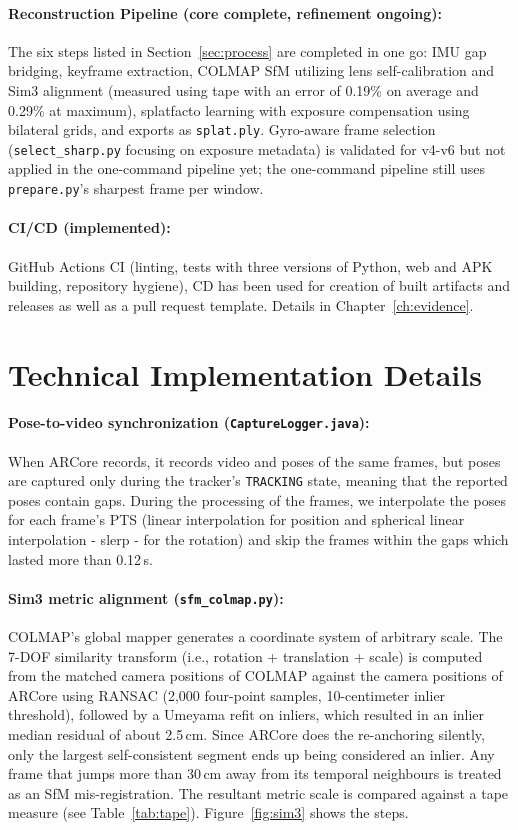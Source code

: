 \paragraph{Reconstruction Pipeline (core complete, refinement ongoing):} The six steps listed in Section~\ref{sec:process} are completed in one go: IMU gap bridging, keyframe extraction, COLMAP SfM utilizing lens self-calibration and Sim3 alignment (measured using tape with an error of 0.19\% on average and 0.29\% at maximum), splatfacto learning with exposure compensation using bilateral grids, and exports as \texttt{splat.ply}. Gyro-aware frame selection (\texttt{select\_sharp.py} focusing on exposure metadata) is validated for v4-v6 but not applied in the one-command pipeline yet; the one-command pipeline still uses \texttt{prepare.py}'s sharpest frame per window.

\paragraph{CI/CD (implemented):} GitHub Actions CI (linting, tests with three versions of Python, web and APK building, repository hygiene), CD has been used for creation of built artifacts and releases as well as a pull request template. Details in Chapter~\ref{ch:evidence}.

\section{Technical Implementation Details}

\paragraph{Pose-to-video synchronization (\texttt{CaptureLogger.java}):} When ARCore records, it records video and poses of the same frames, but poses are captured only during the tracker's \texttt{TRACKING} state, meaning that the reported poses contain gaps. During the processing of the frames, we interpolate the poses for each frame's PTS (linear interpolation for position and spherical linear interpolation - slerp - for the rotation) and skip the frames within the gaps which lasted more than 0.12\,s.

\paragraph{Sim3 metric alignment (\texttt{sfm\_colmap.py}):} COLMAP's global mapper generates a coordinate system of arbitrary scale. The 7-DOF similarity transform (i.e., rotation + translation + scale) is computed from the matched camera positions of COLMAP against the camera positions of ARCore using RANSAC (2,000 four-point samples, 10-centimeter inlier threshold), followed by a Umeyama refit on inliers, which resulted in an inlier median residual of about 2.5\,cm. Since ARCore does the re-anchoring silently, only the largest self-consistent segment ends up being considered an inlier. Any frame that jumps more than 30\,cm away from its temporal neighbours is treated as an SfM mis-registration. The resultant metric scale is compared against a tape measure (see Table~\ref{tab:tape}). Figure~\ref{fig:sim3} shows the steps.

